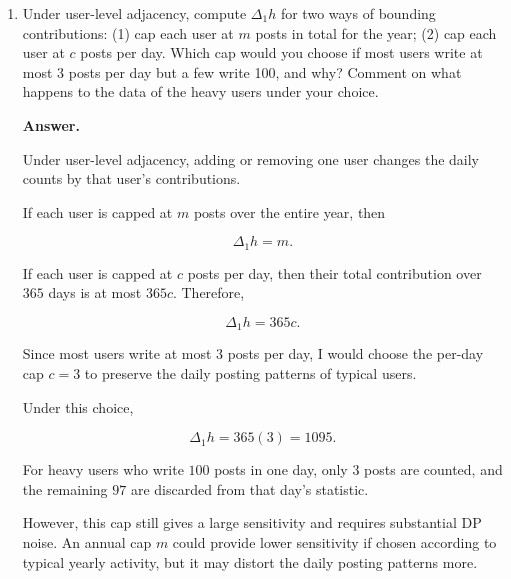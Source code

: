 \documentclass[11pt]{article}
\newcommand{\eps}{\varepsilon}
\newenvironment{answer}{\par\medskip\noindent\textbf{Answer.}\ }{\par\bigskip}
\begin{document}
\begin{enumerate}
\begin{enumerate}
\begin{answer}
\[
Z_j\sim\operatorname{Lap}(0,1/\eps).
\]

Under naive simple composition, the privacy
budget is divided among $365$ queries:

\[
\eps_j=\frac{\eps}{365}.
\]

Thus, the noise scale for each query becomes

\[
b_{\mathrm{naive}}=\frac{365}{\eps},
\]

which is $365$ times larger than the
vector Laplace mechanism.

This split is unnecessary because each post
contributes to only one daily count.
Hence, the entire vector has $\ell_1$
sensitivity $1$ and can be released with
the full privacy budget $\eps$.

\end{answer}

\item Under user-level adjacency, compute $\Delta_1 h$ for two ways of
bounding contributions: (1) cap each user at $m$ posts in total for the
year; (2) cap each user at $c$ posts per day. Which cap would you choose if
most users write at most 3 posts per day but a few write 100, and why?
Comment on what happens to the data of the heavy users under your choice.

\begin{answer}

Under user-level adjacency, adding or removing
one user changes the daily counts by that
user's contributions.

If each user is capped at $m$ posts
over the entire year, then

\[
\boxed{\Delta_1 h=m}.
\]

If each user is capped at $c$ posts per day,
then their total contribution over $365$
days is at most $365c$. Therefore,

\[
\boxed{\Delta_1 h=365c}.
\]

Since most users write at most $3$ posts
per day, I would choose the per-day cap
$c=3$ to preserve the daily posting patterns
of typical users.

Under this choice,

\[
\Delta_1 h=365(3)=1095.
\]

For heavy users who write $100$ posts
in one day, only $3$ posts are counted,
and the remaining $97$ are discarded
from that day's statistic.

However, this cap still gives a large
sensitivity and requires substantial
DP noise. An annual cap $m$ could provide
lower sensitivity if chosen according to
typical yearly activity, but it may
distort the daily posting patterns more.


\end{answer}
\end{enumerate}
\end{enumerate}
\end{document}
